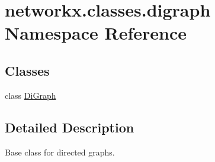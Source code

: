 \hypertarget{namespacenetworkx_1_1classes_1_1digraph}{}\section{networkx.\+classes.\+digraph Namespace Reference}
\label{namespacenetworkx_1_1classes_1_1digraph}
\subsection*{Classes}
\begin{DoxyCompactItemize}
\item 
class \hyperlink{classnetworkx_1_1classes_1_1digraph_1_1DiGraph}{Di\+Graph}
\end{DoxyCompactItemize}


\subsection{Detailed Description}
\begin{DoxyVerb}Base class for directed graphs.\end{DoxyVerb}
 